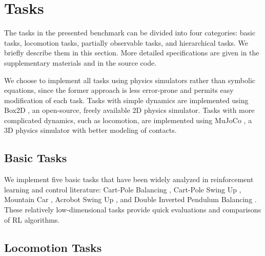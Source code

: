 \documentclass{article}
\begin{document}
\section{Tasks}

The tasks in the presented benchmark can be divided into four categories: basic tasks, locomotion tasks, partially observable tasks, and hierarchical tasks.
We briefly describe them in this section.
More detailed specifications are given in the supplementary materials and in the source code.

We choose to implement all tasks using physics simulators rather than symbolic equations, since the former approach is less error-prone and permits easy modification of each task. Tasks with simple dynamics are implemented using Box2D \cite{Box2D}, an open-source, freely available 2D physics simulator. Tasks with more complicated dynamics, such as locomotion, are implemented using MuJoCo \cite{MuJoCo}, a 3D physics simulator with better modeling of contacts.




\subsection{Basic Tasks}
\label{sec:basic_tasks}








We implement five basic tasks that have been widely analyzed in reinforcement learning and control literature: Cart-Pole Balancing \cite{stephenson1908xx, donaldson1960error, widrow1964pattern, boxes}, Cart-Pole Swing Up \cite{815604, doya2000reinforcement}, Mountain Car \cite{Moore90MountainCar}, Acrobot Swing Up \cite{dejong1994swinging,Murray:M91/46,doya2000reinforcement}, and Double Inverted Pendulum Balancing \cite{Furuta78}. These relatively low-dimensional tasks provide quick evaluations and comparisons of RL algorithms.


















\subsection{Locomotion Tasks}
\label{sec:locomotion_tasks}
\end{document}
